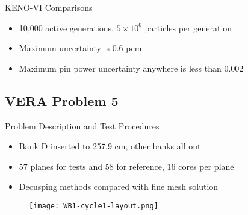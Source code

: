 \begin{frame}[t]{KENO-VI Comparisons}
    \begin{itemize}
        \item 10,000 active generations, $5\times 10^6$ particles per generation
        \item Maximum \keff{} uncertainty is 0.6 pcm
        \item Maximum pin power uncertainty anywhere is less than 0.002
    \end{itemize}
    
\end{frame}


\subsection{VERA Problem 5}
\begin{frame}[t]{Problem Description and Test Procedures}
    
    \vspace{-10pt}
    \begin{itemize}
      \item Bank D inserted to 257.9 cm, other banks all out
      \item 57 planes for tests and 58 for reference, 16 cores per plane
      \item Decusping methods compared with fine mesh solution
    \end{itemize}
    \begin{figure}[h]
      \centering
      \texttt{[image: WB1-cycle1-layout.png]}
    \end{figure}
    
\end{frame}


